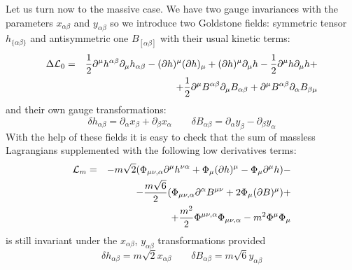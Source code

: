 \documentclass[a4paper,12pt]{article}
\begin{document}
Let us turn now to the massive case. We have two gauge invariances with
the parameters $x_{\alpha\beta}$ and $y_{\alpha\beta}$ so we introduce
two Goldstone fields: symmetric tensor $h_{\{\alpha\beta\}}$ and
antisymmetric one $B_{[\alpha\beta]}$ with their usual kinetic terms:
\begin{eqnarray}
\Delta {\cal L}_0 &=& \frac{1}{2} \partial^\mu h^{\alpha\beta} \partial_\mu
h_{\alpha\beta} - (\partial h)^\mu (\partial h)_\mu + (\partial h)^\mu
\partial_\mu h - \frac{1}{2} \partial^\mu h \partial_\mu h + \nonumber \\
 && + \frac{1}{2} \partial^\mu B^{\alpha\beta} \partial_\mu B_{\alpha\beta}
 + \partial^\mu B^{\alpha\beta} \partial_\alpha B_{\beta\mu}
\end{eqnarray}
and their own gauge transformations:
\begin{equation}
\delta h_{\alpha\beta} = \partial_\alpha x_\beta + \partial_\beta
x_\alpha \qquad
\delta B_{\alpha\beta} = \partial_\alpha y_\beta - \partial_\beta y_\alpha
\end{equation}
With the help of these fields it is easy to check that the sum of massless
Lagrangians supplemented with the following low derivatives terms:
\begin{eqnarray}
{\cal L}_m &=& - m \sqrt{2} (\Phi_{\mu\nu,\alpha} \partial^\mu h^{\nu\alpha}
+ \Phi_\mu (\partial h)^\mu - \Phi_\mu \partial^\mu h ) - \nonumber \\
 && - \frac{m\sqrt{6}}{2} ( \Phi_{\mu\nu,\alpha} \partial^\alpha B^{\mu\nu}
 + 2 \Phi_\mu (\partial B)^\mu ) + \nonumber \\
 && + \frac{m^2}{2} \Phi^{\mu\nu,\alpha} \Phi_{\mu\nu,\alpha} - m^2
 \Phi^\mu \Phi_\mu
\end{eqnarray}
is still invariant under the $x_{\alpha\beta}$, $y_{\alpha\beta}$
transformations provided
\begin{equation}
\delta h_{\alpha\beta} = m \sqrt{2} x_{\alpha\beta} \qquad
\delta B_{\alpha\beta} = m \sqrt{6} y_{\alpha\beta}
\end{equation}
\end{document}
